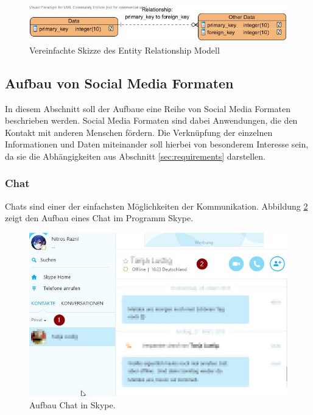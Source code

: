 \documentclass[a4paper]{article}
\begin{document}
	\begin{figure}[H] 
		\includegraphics[width=\linewidth]{../Bilder/ent_rel.jpg}
		\caption{Vereinfachte Skizze des Entity Relationship Modell}
		\label{fig:ent_rel}
	\end{figure}	
	
	\subsection{Aufbau von Social Media Formaten}	
	\label{sec:social}
	
	In diesem Abschnitt soll der Aufbaue eine Reihe von Social Media Formaten
	beschrieben werden. Social Media Formaten sind dabei Anwendungen, die
	den Kontakt mit anderen Menschen fördern. Die Verknüpfung der einzelnen
	Informationen und Daten miteinander soll hierbei von besonderem Interesse sein,
	da sie die Abhängigkeiten aus Abschnitt \ref{sec:requirements} darstellen.
	
	\subsubsection{Chat}	
	
	Chats sind einer der einfachsten Möglichkeiten der Kommunikation. Abbildung
	\ref{fig:chat} zeigt den Aufbau eines Chat im Programm Skype.
	
	\begin{figure}[H] 
		\includegraphics[width=\linewidth]{../Bilder/chat.jpg}
		\caption{Aufbau Chat in Skype. \cite{chat}}
		\label{fig:chat}
	\end{figure}		
	
\end{document}
